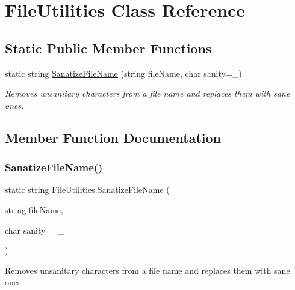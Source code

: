 \hypertarget{class_file_utilities}{}\section{File\+Utilities Class Reference}
\label{class_file_utilities}
\subsection*{Static Public Member Functions}
\begin{DoxyCompactItemize}
\item 
static string \hyperlink{class_file_utilities_af971c071c7fb49c13e5183054b92a30d}{Sanatize\+File\+Name} (string file\+Name, char sanity=\textquotesingle{}\+\_\+\textquotesingle{})
\begin{DoxyCompactList}\small\item\em Removes unsanitary characters from a file name and replaces them with sane ones. \end{DoxyCompactList}\end{DoxyCompactItemize}


\subsection{Member Function Documentation}
\mbox{\label{class_file_utilities_af971c071c7fb49c13e5183054b92a30d}} 
\subsubsection{\texorpdfstring{Sanatize\+File\+Name()}{SanatizeFileName()}}
{\footnotesize\ttfamily static string File\+Utilities.\+Sanatize\+File\+Name (\begin{DoxyParamCaption}\item[{string}]{file\+Name,  }\item[{char}]{sanity = {\ttfamily \textquotesingle{}\+\_\+\textquotesingle{}} }\end{DoxyParamCaption})\hspace{0.3cm}{\ttfamily [static]}}



Removes unsanitary characters from a file name and replaces them with sane ones. 


